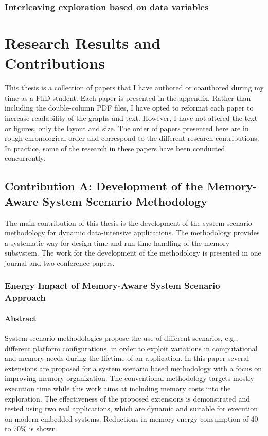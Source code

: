 \subsection{Interleaving exploration based on data variables}


\chapter{Research Results and Contributions}
\label{research}

This thesis is a collection of papers that I have authored or coauthored during my time as a PhD student. 
Each paper is presented in the appendix. 
Rather than including the double-column PDF files, I have opted to reformat each paper to increase readability of the graphs and text. 
However, I have not altered the text or figures, only the layout and size.
The order of papers presented here are in rough chronological order and correspond to the different research contributions. 
In practice, some of the research in these papers have been conducted concurrently.

\section{Contribution A: Development of the Memory-Aware System Scenario Methodology}

The main contribution of this thesis is the development of the system scenario methodology for dynamic data-intensive applications.
The methodology provides a systematic way for design-time and run-time handling of the memory subsystem.
The work for the development of the methodology is presented in one journal and two conference papers.

\subsection{Energy Impact of Memory-Aware System Scenario Approach}

\subsubsection{Abstract}

System scenario methodologies propose the use of different scenarios, e.g., different platform configurations, in order to exploit variations in computational and memory needs during the lifetime of an application. In this paper several extensions are proposed for a system scenario based methodology with a focus on improving memory organization. The conventional methodology targets mostly execution time while this work aims at including memory costs into the exploration. The effectiveness of the proposed extensions is demonstrated and tested using two real applications, which are dynamic and suitable for execution on modern embedded systems. Reductions in memory energy consumption of 40 to 70\% is shown.

